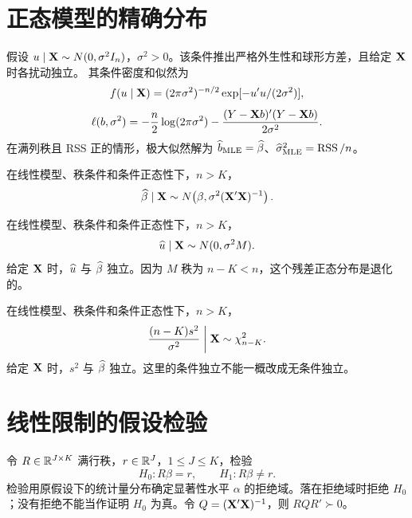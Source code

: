 \section{正态模型的精确分布}

\begin{proposition}[条件正态性（假设 3.5.1）]\label{reg:entry:55}
假设 $u\mid\mathbf{X}\sim N(0,\sigma^2I_n)$，$\sigma^2>0$。该条件推出严格外生性和球形方差，且给定 $\mathbf{X}$ 时各扰动独立。
其条件密度和似然为
\[f(u\mid\mathbf{X})=(2\pi\sigma^2)^{-n/2}\exp[-u'u/(2\sigma^2)],\]
\[\ell(b,\sigma^2)=-\frac n2\log(2\pi\sigma^2)-\frac{(Y-\mathbf{X} b)'(Y-\mathbf{X} b)}{2\sigma^2}.\]
在满列秩且 RSS 正的情形，极大似然解为 $\widehat b_{\rm MLE}=\widehat{\beta}$、$\widehat\sigma^2_{\rm MLE}=\operatorname{RSS}/n$。
\end{proposition}

\begin{theorem}\label{reg:entry:56}
在线性模型、秩条件和条件正态性下，$n>K$，
\[\widehat{\beta}\mid\mathbf{X}\sim N\!\left(\beta,\sigma^2(\mathbf{X}'\mathbf{X})^{-1}\right).\]
\end{theorem}

\begin{theorem}[残差分布及条件独立性]\label{reg:entry:57}
在线性模型、秩条件和条件正态性下，$n>K$，
\[\widehat{u}\mid\mathbf{X}\sim N(0,\sigma^2M).\]
给定 $\mathbf{X}$ 时，$\widehat{u}$ 与 $\widehat{\beta}$ 独立。因为 $M$ 秩为 $n-K<n$，这个残差正态分布是退化的。
\end{theorem}

\begin{theorem}[误差方差估计的分布]\label{reg:entry:58}
在线性模型、秩条件和条件正态性下，$n>K$，
\[\frac{(n-K)s^2}{\sigma^2}\biggm|\mathbf{X}\sim\chi^2_{n-K}.\]
给定 $\mathbf{X}$ 时，$s^2$ 与 $\widehat{\beta}$ 独立。这里的条件独立不能一概改成无条件独立。
\end{theorem}

\section{线性限制的假设检验}

\begin{definition}[线性限制与拒绝域]\label{reg:entry:59}
令 $R\in\mathbb{R}^{J\times K}$ 满行秩，$r\in\mathbb{R}^J$，$1\leq J\leq K$，检验
\[H_0:R\beta=r,\qquad H_1:R\beta\ne r.\]
检验用原假设下的统计量分布确定显著性水平 $\alpha$ 的拒绝域。落在拒绝域时拒绝 $H_0$；没有拒绝不能当作证明 $H_0$ 为真。令 $Q=(\mathbf{X}'\mathbf{X})^{-1}$，则 $RQR'\succ0$。
\end{definition}

